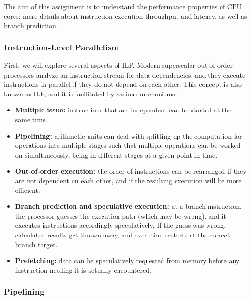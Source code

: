 \documentclass[a4paper,12pt]{exam}
\begin{document}
\suppressfloats



The aim of this assignment is to understand the performance properties of CPU cores: more details about
instruction execution throughput and latency, as well as branch prediction.

\subsubsection*{Instruction-Level Parallelism}

First, we will explore several aspects of \ac{ILP}. Modern superscalar out-of-order processors analyze an instruction stream for data dependencies, 
and they execute instructions in parallel if they do not depend on each other. This concept is also known as \ac{ILP}, and it is facilitated by various mechanisms:

\begin{itemize}
	\item \textbf{Multiple-issue:} instructions that are independent can be started at the same time.
	\item \textbf{Pipelining:} arithmetic units can deal with splitting up the computation for operations into multiple stages such that multiple operations can be worked on simultaneously, being in different stages at a given point in time.
	\item \textbf{Out-of-order execution:} the order of instructions can be rearranged if they are not dependent on each other, and if the resulting execution will be more efficient.
	\item \textbf{Branch prediction and speculative execution:} at a branch instruction, the processor guesses the execution path (which may be wrong), and it executes instructions accordingly speculatively. If the guess was wrong, calculated results get thrown away, and execution restarts at the correct branch target.
	\item \textbf{Prefetching:} data can be speculatively requested from memory before any instruction needing it is actually encountered.
\end{itemize}

\subsubsection*{Pipelining}
\end{document}
